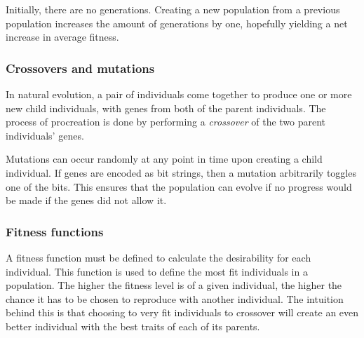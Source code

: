 Initially, there are no generations. Creating a new population from a previous population increases the amount of generations by one, hopefully yielding a net increase in average fitness.

\subsubsection{Crossovers and mutations}
In natural evolution, a pair of individuals come together to produce one or more new child individuals, with genes from both of the parent individuals. The process of procreation is done by performing a \emph{crossover} of the two parent individuals' genes.



Mutations can occur randomly at any point in time upon creating a child individual. If genes are encoded as bit strings, then a mutation arbitrarily toggles one of the bits. This ensures that the population can evolve if no progress would be made if the genes did not allow it.

\subsubsection{Fitness functions}
A fitness function must be defined to calculate the desirability for each individual. This function is used to define the most fit individuals in a population. The higher the fitness level is of a given individual, the higher the chance it has to be chosen to reproduce with another individual. The intuition behind this is that choosing to very fit individuals to crossover will create an even better individual with the best traits of each of its parents.

